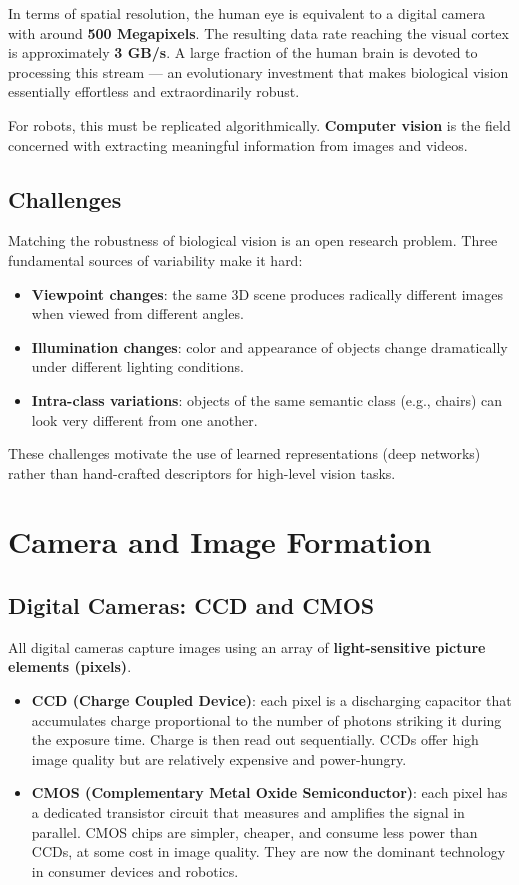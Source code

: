 \documentclass[11pt,a4paper]{article}
\theoremstyle{definition}
\theoremstyle{plain}
\theoremstyle{remark}
\begin{document}
In terms of spatial resolution, the human eye is equivalent to a digital camera with around \textbf{500 Megapixels}. The resulting data rate reaching the visual cortex is approximately \textbf{3 GB/s}. A large fraction of the human brain is devoted to processing this stream — an evolutionary investment that makes biological vision essentially effortless and extraordinarily robust.

For robots, this must be replicated algorithmically. \textbf{Computer vision} is the field concerned with extracting meaningful information from images and videos.

\subsection{Challenges}

Matching the robustness of biological vision is an open research problem. Three fundamental sources of variability make it hard:

\begin{itemize}
    \item \textbf{Viewpoint changes}: the same 3D scene produces radically different images when viewed from different angles.
    \item \textbf{Illumination changes}: color and appearance of objects change dramatically under different lighting conditions.
    \item \textbf{Intra-class variations}: objects of the same semantic class (e.g., chairs) can look very different from one another.
\end{itemize}

These challenges motivate the use of learned representations (deep networks) rather than hand-crafted descriptors for high-level vision tasks.

\section{Camera and Image Formation}

\subsection{Digital Cameras: CCD and CMOS}

All digital cameras capture images using an array of \textbf{light-sensitive picture elements (pixels)}.

\begin{itemize}
    \item \textbf{CCD (Charge Coupled Device)}: each pixel is a discharging capacitor that accumulates charge proportional to the number of photons striking it during the exposure time. Charge is then read out sequentially. CCDs offer high image quality but are relatively expensive and power-hungry.
    \item \textbf{CMOS (Complementary Metal Oxide Semiconductor)}: each pixel has a dedicated transistor circuit that measures and amplifies the signal in parallel. CMOS chips are simpler, cheaper, and consume less power than CCDs, at some cost in image quality. They are now the dominant technology in consumer devices and robotics.
\end{itemize}
\end{document}
